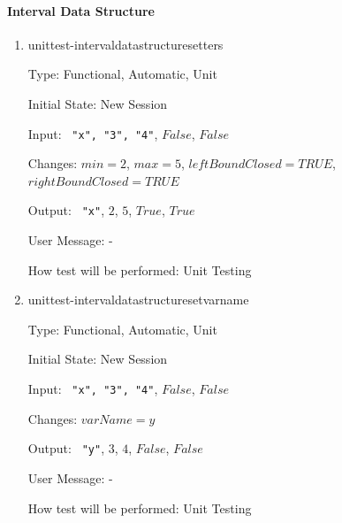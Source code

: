 \documentclass[12pt, titlepage]{article}
\begin{document}
\paragraph{Interval Data Structure}
\begin{enumerate}
	
	\item{unittest-intervaldatastructuresetters}
	
	Type: Functional, Automatic, Unit
	
	Initial State: New Session
	
	Input: \texttt{ "x", "3", "4"}, $False$, $False$
	
	Changes: $min = 2$, $max = 5$, $leftBoundClosed = TRUE$, $rightBoundClosed 
	= TRUE$
	
	Output: \texttt{ "x"}, $2$, $5$, $True$, $True$
	
	User Message: - 
	
	How test will be performed: Unit Testing\\
	
	\item{unittest-intervaldatastructuresetvarname}
	
	Type: Functional, Automatic, Unit
	
	Initial State: New Session
	
	Input: \texttt{ "x", "3", "4"}, $False$, $False$
	
	Changes: $varName = y$
	
	Output: \texttt{ "y"}, $3$, $4$, $False$, $False$
	
	User Message: -
	
	How test will be performed: Unit Testing\\
	
\end{enumerate}
\end{document}

